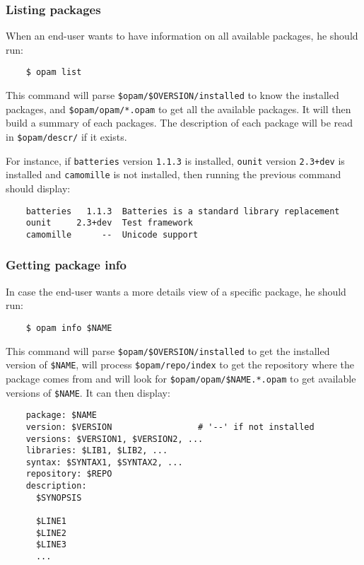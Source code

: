 \documentclass[a4paper,11pt]{article}
\begin{document}
\subsubsection{Listing packages}
\label{opam-list}

When an end-user wants to have information on all available packages,
he should run:

\begin{verbatim}
    $ opam list
\end{verbatim}

This command will parse \verb+$opam/$OVERSION/installed+ to know the
installed packages, and \verb+$opam/opam/*.opam+ to get all the
available packages. It will then build a summary of each packages. The
description of each package will be read in \verb+$opam/descr/+ if it
exists.

For instance, if {\tt batteries} version {\tt 1.1.3} is installed,
{\tt ounit} version {\tt 2.3+dev} is installed and {\tt camomille} is
not installed, then running the previous command should display:

\begin{verbatim}
    batteries   1.1.3  Batteries is a standard library replacement
    ounit     2.3+dev  Test framework
    camomille      --  Unicode support
\end{verbatim}

\subsubsection{Getting package info}

In case the end-user wants a more details view of a specific package,
he should run:

\begin{verbatim}
    $ opam info $NAME
\end{verbatim}

This command will parse \verb+$opam/$OVERSION/installed+ to get the
installed version of \verb+$NAME+, will process
\verb+$opam/repo/index+ to get the repository where the package comes
from and will look for \verb+$opam/opam/$NAME.*.opam+ to get available
versions of \verb+$NAME+. It can then display:

\begin{verbatim}
    package: $NAME
    version: $VERSION                 # '--' if not installed
    versions: $VERSION1, $VERSION2, ...
    libraries: $LIB1, $LIB2, ...
    syntax: $SYNTAX1, $SYNTAX2, ...
    repository: $REPO
    description:
      $SYNOPSIS

      $LINE1
      $LINE2
      $LINE3
      ...
\end{verbatim}
\end{document}
